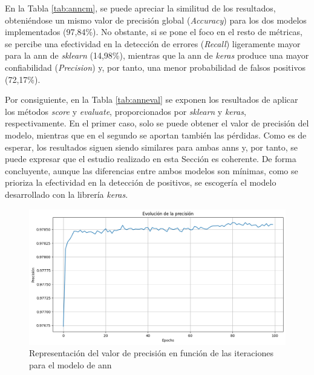 \vspace{3mm}

En la Tabla \ref{tab:anncm}, se puede apreciar la similitud de los resultados, obteniéndose un mismo valor de precisión global (\textit{Accuracy}) para los dos modelos implementados (97,84\%). No obstante, si se pone el foco en el resto de métricas, se percibe una efectividad en la detección de errores (\textit{Recall}) ligeramente mayor para la \gls{ann} de \textit{sklearn} (14,98\%), mientras que
la \gls{ann} de \textit{keras} produce una mayor confiabilidad (\textit{Precision}) y, por tanto, una menor probabilidad de falsos positivos (72,17\%). 

\vspace{3mm}

Por consiguiente, en la Tabla \ref{tab:anneval} se exponen los resultados de aplicar los métodos \textit{score} y \textit{evaluate}, proporcionados por \textit{sklearn} y \textit{keras}, respectivamente. En el primer caso, solo se puede obtener el valor de precisión del modelo, mientras que en el segundo se aportan también las pérdidas. Como es de esperar, los resultados siguen siendo similares para ambas \gls{ann}s y, por tanto, se puede expresar que el estudio realizado en esta Sección es coherente. De forma concluyente, aunque las diferencias entre ambos modelos son mínimas, como se prioriza la efectividad en la detección de positivos, se escogería el modelo desarrollado con la librería \textit{keras}.

\vspace{3mm}

\begin{figure}[H]
  \centering
  \includegraphics[width=1\textwidth]{img/desarrollo/ann/3annacc.png}
  \caption{Representación del valor de precisión en función de las iteraciones para el modelo de \acrshort{ann}}
  \label{fig:3annacc}
\end{figure}

